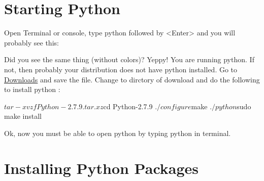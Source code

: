 \section{Starting Python}

Open Terminal or console, type {\color{magenta} python} followed by {\color{magenta} <Enter>} and you will probably see this:


Did you see the same thing (without colors)? Yeppy! You are running python.
If not, then probably your distribution does not have python installed. Go to \href{https://www.python.org/ftp/python/2.7.9/Python-2.7.9.tar.xz}{Downloads} and save the file. Change to dirctory of download and do the following to install python :

\begin{bashcommands}
$tar -xvzf Python-2.7.9.tar.xz
$cd Python-2.7.9
$./configure
$make
$./python
$sudo make install
\end{bashcommands}

Ok, now you must be able to open python by typing {\color{magenta} python} in terminal.

\section{Installing Python Packages}